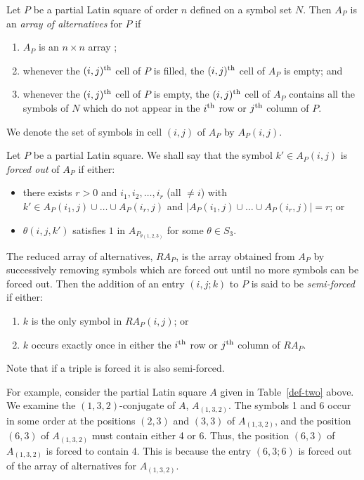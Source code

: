 \documentclass[12pt]{report}
\begin{document}
Let $P$ be a partial Latin square of order $n$ defined on a symbol set $N$.  
Then $A_P$ is an {\it array of alternatives} for $P$ if
\begin{enumerate}
\item $A_P$ is an $n \times n$ array ;
\item whenever the $(i,j)^{\rm {th}}$ cell of $P$ is filled, the  
$(i,j)^{\rm {th}}$ cell of $A_P$ is empty; and
\item whenever the $(i,j)^{\rm {th}}$ cell of $P$ is empty, the 
$(i,j)^{\rm {th}}$ cell of $A_P$ contains all the symbols of $N$ which do 
not appear in the $i^{\rm {th}}$ row or $j^{\rm {th}}$ column of $P$.
\end{enumerate}
We denote the set of symbols in cell $(i,j)$ of $A_P$ by ${A_P}(i,j)$. 
{\rm
Let $P$ be a partial Latin square. We shall say that the symbol  
$k'\in A_P(i,j)$ is {\it forced out} of $A_P$ if either:
\begin{itemize}
\item [(1)] there exists $r>0$ and $i_1,i_2,\ldots,i_r$ (all $\neq i$) 
with $k'\in A_P(i_1,j)\cup\ldots\cup A_P(i_r,j)$ and 
$|A_P(i_1,j)\cup\ldots\cup A_P(i_r,j)|=r$; or 
\item [(2)] $\theta(i,j,k')$ satisfies $1$ in $A_{P_{\theta(1,2,3)}}$ for
some $\theta\in S_3$.
\end{itemize}

The reduced array of alternatives,
$RA_P$, is the array obtained from $A_P$ by successively removing
symbols which are forced out until no more symbols can be forced out.
Then the addition
of an entry $(i,j;k)$ to $P$ is said to be {\it semi-forced} if either:

\begin{enumerate}
\item $k$ is the only symbol in $RA_P(i,j)$; or
\item $k$ occurs exactly once in either the $i^{\rm {th}}$ row or
$j^{\rm {th}}$ column of $RA_P$.
\end{enumerate}
}

Note that if a triple is forced it is also semi-forced.

For example, consider the partial Latin square $A$ given in 
Table~\ref{def-two} above.  We examine
the $(1,3,2)$-conjugate of $A$, $A_{(1,3,2)}$.  The symbols 1 and 6 occur in
some order at the positions $(2,3)$ and $(3,3)$ of $A_{(1,3,2)}$, and
the position $(6,3)$ of $A_{(1,3,2)}$ must contain either 4 or 6.
Thus, the position $(6,3)$ of $A_{(1,3,2)}$ is forced to contain 4.
This is because the entry $(6,3;6)$ is forced out of the array
of alternatives for $A_{(1,3,2)}$.
\end{document}
